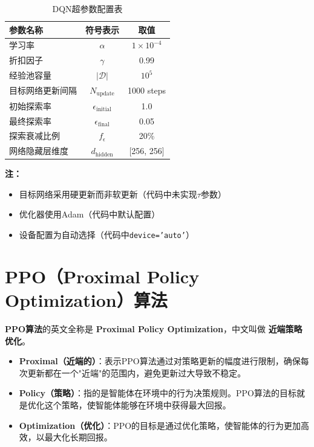 \begin{table}[H]
    \centering
    \caption{DQN超参数配置表}
    \label{tab:dqn_params}
    \begin{tabular}{lcc}
        \toprule
        参数名称 & 符号表示 & 取值 \\
        \midrule
        学习率 & $\alpha$ & $1\times10^{-4}$ \\
        折扣因子 & $\gamma$ & 0.99 \\
        经验池容量 & $|\mathcal{D}|$ & $10^5$ \\
        目标网络更新间隔 & $N_{\text{update}}$ & 1000 steps \\
        初始探索率 & $\epsilon_{\text{initial}}$ & 1.0 \\
        最终探索率 & $\epsilon_{\text{final}}$ & 0.05 \\
        探索衰减比例 & $f_{\epsilon}$ & 20\% \\ 
        网络隐藏层维度 & $d_{\text{hidden}}$ & [256, 256] \\
        \bottomrule
    \end{tabular}
\end{table}

\noindent \textbf{注：}
\begin{itemize}
    \item 目标网络采用硬更新而非软更新（代码中未实现$\tau$参数）
    \item 优化器使用Adam（代码中默认配置）
    \item 设备配置为自动选择（代码中\texttt{device='auto'}）
\end{itemize}

\section{PPO（Proximal Policy Optimization）算法}

\textbf{PPO算法}的英文全称是 \textbf{Proximal Policy Optimization}，中文叫做 \textbf{近端策略优化}。

\begin{itemize}
    \item \textbf{Proximal（近端的）}：表示PPO算法通过对策略更新的幅度进行限制，确保每次更新都在一个"近端"的范围内，避免更新过大导致不稳定。
    \item \textbf{Policy（策略）}：指的是智能体在环境中的行为决策规则。PPO算法的目标就是优化这个策略，使智能体能够在环境中获得最大回报。
    \item \textbf{Optimization（优化）}：PPO的目标是通过优化策略，使智能体的行为更加高效，以最大化长期回报。
\end{itemize}

